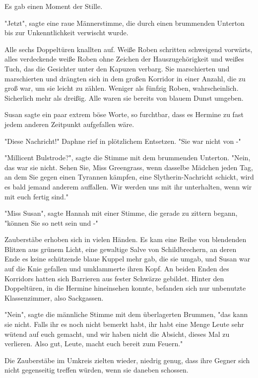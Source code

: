 {Es gab einen Moment der Stille.

"Jetzt", sagte eine raue Männerstimme, die durch einen brummenden Unterton bis zur Unkenntlichkeit verwischt wurde.

Alle sechs Doppeltüren knallten auf. Weiße Roben schritten schweigend vorwärts, alles verdeckende weiße Roben ohne Zeichen der Hauszugehörigkeit und weißes Tuch, das die Gesichter unter den Kapuzen verbarg. Sie marschierten und marschierten und drängten sich in dem großen Korridor in einer Anzahl, die zu groß war, um sie leicht zu zählen. Weniger als fünfzig Roben, wahrscheinlich. Sicherlich mehr als dreißig. Alle waren sie bereits von blauem Dunst umgeben.

Susan sagte ein paar extrem böse Worte, so furchtbar, dass es Hermine zu fast jedem anderen Zeitpunkt aufgefallen wäre.

"Diese Nachricht!" Daphne rief in plötzlichem Entsetzen. "Sie war nicht von -"

"Millicent Bulstrode?", sagte die Stimme mit dem brummenden Unterton. "Nein, das war sie nicht. Sehen Sie, Miss Greengrass, wenn dasselbe Mädchen jeden Tag, an dem Sie gegen einen Tyrannen kämpfen, eine Slytherin-Nachricht schickt, wird es bald jemand anderem auffallen. Wir werden uns mit ihr unterhalten, wenn wir mit euch fertig sind."

"Miss Susan", sagte Hannah mit einer Stimme, die gerade zu zittern begann, "können Sie so nett sein und -"

Zauberstäbe erhoben sich in vielen Händen. Es kam eine Reihe von blendenden Blitzen aus grünem Licht, eine gewaltige Salve von Schildbrechern, an deren\\ Ende es keine schützende blaue Kuppel mehr gab, die sie umgab, und Susan war auf die Knie gefallen und umklammerte ihren Kopf. An beiden Enden des Korridors hatten sich Barrieren aus fester Schwärze gebildet. Hinter den Doppeltüren, in die Hermine hineinsehen konnte, befanden sich nur unbenutzte Klassenzimmer, also Sackgassen.

"Nein", sagte die männliche Stimme mit dem überlagerten Brummen, "das kann sie nicht. Falls ihr es noch nicht bemerkt habt, ihr habt eine Menge Leute sehr wütend auf euch gemacht, und wir haben nicht die Absicht, dieses Mal zu verlieren. Also gut, Leute, macht euch bereit zum Feuern."

Die Zauberstäbe im Umkreis zielten wieder, niedrig genug, dass ihre Gegner sich nicht gegenseitig treffen würden, wenn sie daneben schossen.

}
